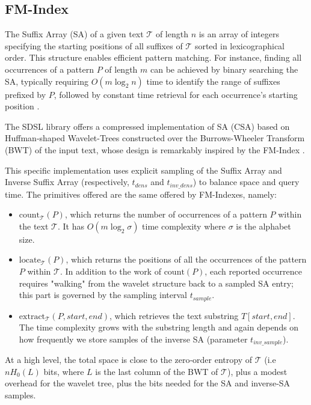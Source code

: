 \subsection{FM-Index}
The Suffix Array (SA) of a given text $\mathcal T$ of length $n$ is an array of integers specifying the starting positions of all suffixes of $\mathcal T$ sorted in lexicographical order. This structure enables efficient pattern matching. For instance, finding all occurrences of a pattern $P$ of length $m$ can be achieved by binary searching the SA, typically requiring $O(m \log_2 n)$ time to identify the range of suffixes prefixed by $P$, followed by constant time retrieval for each occurrence's starting position \cite[Section~10.2]{PearlsAE}.

The SDSL library \cite{sdsl} offers a compressed implementation of SA (CSA) based on Huffman-shaped Wavelet-Trees \cite{wt} constructed over the Burrows-Wheeler Transform (BWT) \cite{BWT} of the input text, whose design is remarkably inspired by the FM-Index \cite{FMIndex}.

This specific implementation uses explicit sampling of the Suffix Array and Inverse Suffix Array (respectively,  $t_{dens}$ and $t_{inv\_dens}$) to balance space and query time.
The primitives offered are the same offered by FM-Indexes, namely:
\begin{itemize}
    \item $\mathrm{count}_{\mathcal T}(P)$, which returns the number of occurrences of a pattern $P$ within the text $\mathcal T$. It has $O(m \log_2 \sigma )$ time complexity where $\sigma$ is the alphabet size.
    \item $\mathrm{locate}_{\mathcal T}(P)$, which returns the positions of all the occurrences of the pattern $P$ within $\mathcal T$. In addition to the work of $\mathrm{count}(P)$, each reported occurrence requires "walking" from the wavelet structure back to a sampled SA entry; this part is governed by the sampling interval $t_{sample}$.
    \item $\mathrm{extract}_{\mathcal T}(P, \mathit{start}, \mathit{end})$, which retrieves the text substring $T[\mathit{start}, \mathit{end}]$.  The time complexity grows with the substring length and again depends on how frequently we store samples of the inverse SA (parameter $t_{inv\_sample}$).
\end{itemize}

At a high level, the total space is close to the zero‑order entropy of $\mathcal T$ (i.e $n H_0(L)$ bits, where $L$ is the last column of the BWT of $\mathcal T$), plus a modest overhead for the wavelet tree, plus the bits needed for the SA and inverse‑SA samples.



